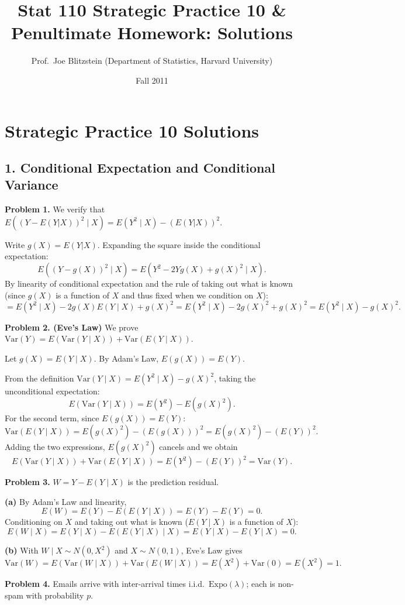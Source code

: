 \documentclass{article}
\title{Stat 110 Strategic Practice 10 \& Penultimate Homework: Solutions}
\author{Prof.\ Joe Blitzstein (Department of Statistics, Harvard University)}
\date{Fall 2011}
\begin{document}
\maketitle

\section*{Strategic Practice 10 Solutions}

\subsection*{1. Conditional Expectation and Conditional Variance}

\textbf{Problem 1.} We verify that $E((Y-E(Y|X))^2\mid X)=E(Y^2\mid X)-(E(Y|X))^2$.

Write $g(X)=E(Y|X)$. Expanding the square inside the conditional expectation:
$$
E((Y-g(X))^2\mid X)=E(Y^2-2Yg(X)+g(X)^2\mid X).
$$
By linearity of conditional expectation and the rule of taking out what is known (since $g(X)$ is a function of $X$ and thus fixed when we condition on $X$):
$$
=E(Y^2\mid X)-2g(X)E(Y\mid X)+g(X)^2 = E(Y^2\mid X)-2g(X)^2+g(X)^2 = E(Y^2\mid X)-g(X)^2.
$$

\bigskip
\textbf{Problem 2. (Eve's Law)} We prove $\text{Var}(Y)=E(\text{Var}(Y\mid X))+\text{Var}(E(Y\mid X))$.

Let $g(X)=E(Y\mid X)$. By Adam's Law, $E(g(X))=E(Y)$.

From the definition $\text{Var}(Y\mid X)=E(Y^2\mid X)-g(X)^2$, taking the unconditional expectation:
$$
E(\text{Var}(Y\mid X))=E(Y^2)-E(g(X)^2).
$$
For the second term, since $E(g(X))=E(Y)$:
$$
\text{Var}(E(Y\mid X))=E(g(X)^2)-(E(g(X)))^2=E(g(X)^2)-(E(Y))^2.
$$
Adding the two expressions, $E(g(X)^2)$ cancels and we obtain
$$
E(\text{Var}(Y\mid X))+\text{Var}(E(Y\mid X))=E(Y^2)-(E(Y))^2=\text{Var}(Y).
$$

\bigskip
\textbf{Problem 3.} $W=Y-E(Y\mid X)$ is the prediction residual.

\textbf{(a)} By Adam's Law and linearity,
$$
E(W)=E(Y)-E(E(Y\mid X))=E(Y)-E(Y)=0.
$$
Conditioning on $X$ and taking out what is known ($E(Y\mid X)$ is a function of $X$):
$$
E(W\mid X)=E(Y\mid X)-E(E(Y\mid X)\mid X)=E(Y\mid X)-E(Y\mid X)=0.
$$

\textbf{(b)} With $W\mid X\sim N(0,X^2)$ and $X\sim N(0,1)$, Eve's Law gives
$$
\text{Var}(W)=E(\text{Var}(W\mid X))+\text{Var}(E(W\mid X))=E(X^2)+\text{Var}(0)=E(X^2)=1.
$$

\bigskip
\textbf{Problem 4.} Emails arrive with inter-arrival times i.i.d.\ $\text{Expo}(\lambda)$; each is non-spam with probability $p$.
\end{document}
